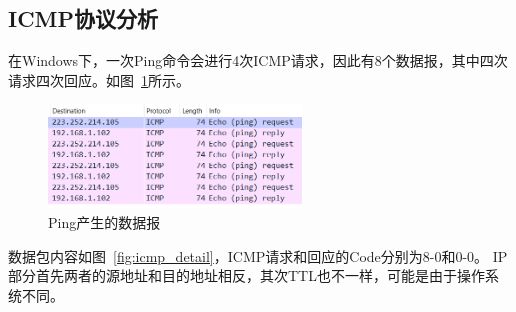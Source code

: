 \documentclass[a4paper,twoside]{article}
\begin{document}
\begin{spacing}{1.2}
\subsection{ICMP协议分析}

在Windows下，一次Ping命令会进行4次ICMP请求，因此有8个数据报，其中四次请求四次回应。如图~\ref{fig:icmp}所示。

\begin{figure}[htb]
	\centering
	\caption{Ping产生的数据报}
	\label{fig:icmp}
	\includegraphics[width=0.6\textwidth]{icmp.png}
\end{figure}

数据包内容如图~\ref{fig:icmp_detail}，ICMP请求和回应的Code分别为8-0和0-0。
IP部分首先两者的源地址和目的地址相反，其次TTL也不一样，可能是由于操作系统不同。


\end{spacing}
\end{document}
